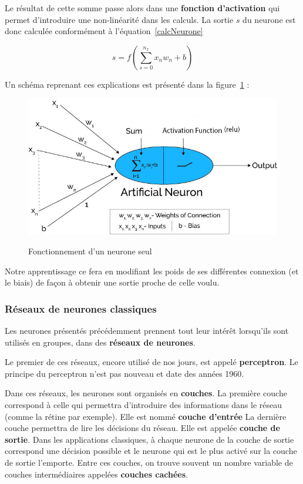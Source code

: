 Le résultat de cette somme passe alors dans une \textbf{fonction d'activation} qui permet d'introduire une non-linéarité dans les calculs. La sortie $s$ du neurone est donc calculée conformément à l'équation~\ref{calcNeurone}

\begin{equation}
\label{calcNeurone}
s = f(\sum_{s=0}^{n_{x}} x_{n}w_{n} + b)
\end{equation}

Un schéma reprenant ces explications est présenté dans la figure~\ref{neuroneSeul} :

\begin{figure}[h]
\includegraphics[width=16.5cm]{./images/image2.jpg}
\label{neuroneSeul}
\caption{Fonctionnement d'un neurone seul}
\end{figure}

Notre apprentissage ce fera en modifiant les poids de ses différentes
connexion (et le biais) de façon à obtenir une sortie proche de celle voulu.\newline

\subsubsection{Réseaux de neurones classiques}

Les neurones présentés précédemment prennent tout leur intérêt lorsqu'ils sont utilisés en groupes, dans des \textbf{réseaux de neurones}.

Le premier de ces réseaux, encore utilisé de nos jours, est appelé \textbf{perceptron}.
Le principe du perceptron n'est pas nouveau et date des années 1960.

Dans ces réseaux, les neurones sont organisés en \textbf{couches}.
La première couche correspond à celle qui permettra d'introduire des informations dans le réseau (comme la rétine par exemple). Elle est nommé \textbf{couche d'entrée}
La dernière couche permettra de lire les décisions du réseau. Elle est appelée \textbf{couche de sortie}. Dans les applications classiques, à chaque neurone de la couche de sortie correspond une décision possible et le neurone qui est le plus activé sur la couche de sortie l'emporte.
Entre ces couches, on trouve souvent un nombre variable de couches intermédiaires appelées \textbf{couches cachées}.

